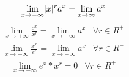 \begin{multicols}{2}
\begin{equation}
\end{equation}
\begin{equation}
	\lim_{x\to-\infty}\lvert x\rvert^ra^x=\lim_{x\to\infty}a^x
\end{equation}
\begin{equation}
	\begin{matrix}
		\lim_{x\to+\infty}\frac{e^x}{x^r}=\lim_{x\to+\infty}a^x&\forall r \in R^+
	\end{matrix}
\end{equation}
\begin{equation}
	\begin{matrix}
		\lim_{x\to+\infty}\frac{x^x}{e^r}=\lim_{x\to+\infty}a^x&\forall r \in R^+
	\end{matrix}
\end{equation}
\begin{equation}
	\begin{matrix}
		\lim_{x\to-\infty}e^x*x^r=0&\forall r \in R^+
	\end{matrix}
\end{equation}
\end{multicols}
